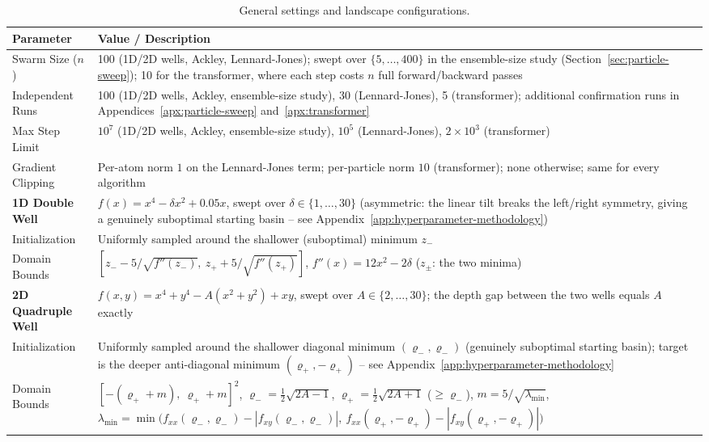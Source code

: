 \documentclass{article} %
\theoremstyle{plain}
\theoremstyle{definition}
\theoremstyle{remark}
\begin{document}
\begin{table}[!htbp]
\centering
\caption{General settings and landscape configurations.}
\label{tab:general_settings}
\small
\begin{tabular}{@{}lp{}@{}}
\toprule
\textbf{Parameter} & \textbf{Value / Description} \\
\midrule
Swarm Size ($n$) & 100 (1D/2D wells, Ackley, Lennard-Jones); swept over $\{5,\dots,400\}$ in the ensemble-size study (Section~\ref{sec:particle-sweep}); 10 for the transformer, where each step costs $n$ full forward/backward passes \\
Independent Runs & 100 (1D/2D wells, Ackley, ensemble-size study), 30 (Lennard-Jones), 5 (transformer); additional confirmation runs in Appendices~\ref{apx:particle-sweep} and~\ref{apx:transformer} \\
Max Step Limit & $10^7$ (1D/2D wells, Ackley, ensemble-size study), $10^5$ (Lennard-Jones), $2\times10^3$ (transformer) \\
Gradient Clipping & Per-atom norm $1$ on the Lennard-Jones term; per-particle norm $10$ (transformer); none otherwise; same for every algorithm \\
\midrule
\textbf{1D Double Well} & $f(x) = x^4 - \delta x^2 + 0.05x$, swept over $\delta\in\{1,\dots,30\}$ (asymmetric: the linear tilt breaks the left/right symmetry, giving a genuinely suboptimal starting basin -- see Appendix~\ref{app:hyperparameter-methodology}) \\
Initialization & Uniformly sampled around the shallower (suboptimal) minimum $z_-$ \\
Domain Bounds & $[z_- - 5/\sqrt{f''(z_-)},\ z_+ + 5/\sqrt{f''(z_+)}]$, $f''(x)=12x^2-2\delta$ ($z_\pm$: the two minima) \\
\midrule
\textbf{2D Quadruple Well} & $f(x,y) = x^4 + y^4 - A(x^2 + y^2) + xy$, swept over $A\in\{2,\dots,30\}$; the depth gap between the two wells equals $A$ exactly \\
Initialization & Uniformly sampled around the shallower diagonal minimum $(\varrho_-,\varrho_-)$ (genuinely suboptimal starting basin); target is the deeper anti-diagonal minimum $(\varrho_+,-\varrho_+)$ -- see Appendix~\ref{app:hyperparameter-methodology} \\
Domain Bounds & $[-(\varrho_++m),\ \varrho_++m]^2$, $\varrho_-=\tfrac12\sqrt{2A-1}$, $\varrho_+=\tfrac12\sqrt{2A+1}$ ($\geq\varrho_-$), $m=5/\sqrt{\lambda_{\min}}$, $\lambda_{\min}=\min\big(f_{xx}(\varrho_-,\varrho_-)-|f_{xy}(\varrho_-,\varrho_-)|,\ f_{xx}(\varrho_+,-\varrho_+)-|f_{xy}(\varrho_+,-\varrho_+)|\big)$ \\

\end{tabular}
\end{table}
\end{document}
